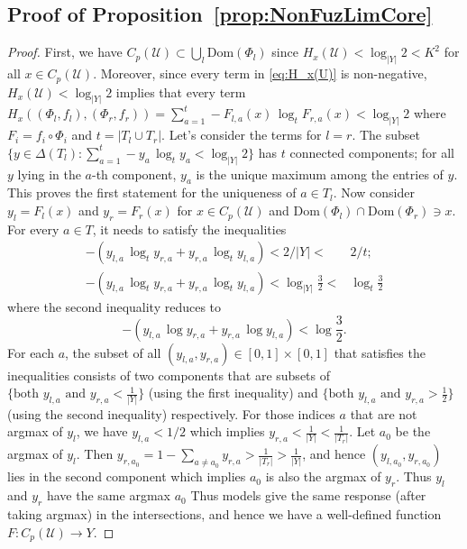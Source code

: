 \documentclass{article}
\theoremstyle{plain}
\theoremstyle{definition}
\theoremstyle{remark}
\newcommand{\cU}{\mathcal{U}}
\newcommand{\Dom}{\mathrm{Dom}}
\begin{document}
\subsection{Proof of Proposition~\ref{prop:NonFuzLimCore}}
\label{app:proof:prop:NonFuzLimCore}
\begin{proof}
	
	First, we have $C_p(\cU) \subset \bigcup_l \Dom(\Phi_l)$ since $H_x(\cU) < \log_{|Y|} 2 < K^2$ for all $x\in C_p(\cU)$. Moreover, since every term in \eqref{eq:H_x(U)} is non-negative, $H_x(\cU) < \log_{|Y|} 2$ implies that every term $H_x((\Phi_l,f_l),(\Phi_r,f_r)) = \sum_{a=1}^t -F_{l,a}(x) \,\log_t F_{r,a}(x) < \log_{|Y|} 2$ where $F_i = f_i \circ \Phi_i$ and $t = |T_l \cup T_r|$. Let's consider the terms for $l=r$. The subset $\{y \in \Delta(T_l): \sum_{a=1}^t -y_a \,\log_t y_a < \log_{|Y|} 2\}$ has $t$ connected components; for all $y$ lying in the $a$-th component, $y_a$ is the unique maximum among the entries of $y$. This proves the first statement for the uniqueness of $a \in T_l$. Now consider $y_l = F_{l}(x)$ and $y_r = F_{r}(x)$ for $x\in C_p(\cU)$ and $\Dom(\Phi_l) \cap \Dom(\Phi_r) \ni x$.  For every $a \in T$, it needs to satisfy the inequalities 
	\begin{align*}
		-(y_{l,a} \,\log_t y_{r,a} + y_{r,a} \,\log_t y_{l,a}) < 2/|Y| <& 2/t; \\
		-(y_{l,a} \,\log_t y_{r,a} + y_{r,a} \,\log_t y_{l,a}) < \log_{|Y|} \frac{3}{2} <& \log_t \frac{3}{2}
	\end{align*}
	where the second inequality reduces to
	$$-(y_{l,a} \,\log y_{r,a} + y_{r,a} \,\log y_{l,a})< \log \frac{3}{2}.$$ 
	For each $a$, the subset of all $(y_{l,a},y_{r,a})\in [0,1]\times [0,1]$ that satisfies the inequalities consists of two components that are subsets of $\{\textrm{both } y_{l,a} \textrm{ and } y_{r,a} < \frac{1}{|Y|}\}$ (using the first inequality) and $\{\textrm{both } y_{l,a} \textrm{ and } y_{r,a} > \frac{1}{2}\}$ (using the second inequality) respectively. For those indices $a$ that are not argmax of $y_l$, we have $y_{l,a} < 1/2$ which implies $y_{r,a} < \frac{1}{|Y|} < \frac{1}{|T_r|}$. Let  $a_0$ be the argmax of $y_l$. Then $y_{r,a_0} = 1 - \sum_{a\not=a_0} y_{r,a} > \frac{1}{|T_r|}>\frac{1}{|Y|}$, and hence $(y_{l,a_0},y_{r,a_0})$ lies in the second component which implies $a_0$ is also the argmax of $y_r$. Thus $y_l$ and $y_r$ have the same argmax $a_0$ Thus models give the same response (after taking argmax) in the intersections, and hence we have a well-defined function $F:C_p(\cU)\to Y$.
\end{proof}
\end{document}
